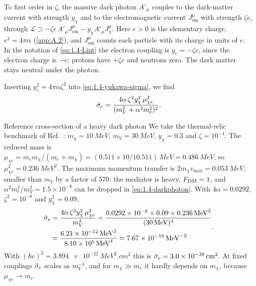 \begin{keyresult}
To first order in $\zeta$, the massive dark photon $A'_\mu$ couples to the dark-matter current with strength $y_\chi$ and to the electromagnetic current $J^\mu_{\mathrm{em}}$ with strength $\zeta e$, through $\mathcal{L} \supset -\zeta e\,A'_\mu J^\mu_{\mathrm{em}} - y_\chi A'_\mu J^\mu_\chi$. Here $e > 0$ is the elementary charge, $e^2 = 4\pi\alpha$ (\cref{app:A.2}), and $J^\mu_{\mathrm{em}}$ counts each particle with its charge in units of $e$. In the notation of \cref{eq:1.4-Lint} the electron coupling is $y_e = -\zeta e$, since the electron charge is $-e$; protons have $+\zeta e$ and neutrons zero. The dark matter stays neutral under the photon.
\end{keyresult}

\noindent Inserting $y_e^2 = 4\pi\alpha\zeta^2$ into \cref{eq:1.4-yukawa-sigma}, we find~\cites[Eq.~(74)]{lin2019tasi}[display above Eq.~(15)]{essig2012direct}
\begin{equation}
  \bar{\sigma}_{e} = \frac{4\alpha\,\zeta^2 y_\chi^2\,\mu_{\chi e}^2}{(m_V^2 + \alpha^2 m_e^2)^2}.
  \label{eq:1.4-darkphoton}
\end{equation}

\begin{workedexample}{Reference cross-section of a heavy dark photon}\label{we:1-darkphoton}
We take the thermal-relic benchmark of Ref.~\cite[Sect.~III\,D]{lin2019tasi}: $m_\chi = \SI{10}{MeV}$, $m_V = \SI{30}{MeV}$, $y_\chi = 0.3$ and $\zeta = 10^{-4}$. The reduced mass is $\mu_{\chi e} = m_e m_\chi/(m_e + m_\chi) = (0.511 \times 10/10.511)\,\si{MeV} = \SI{0.486}{MeV}$, so $\mu_{\chi e}^2 = \SI{0.236}{MeV^2}$. The maximum momentum transfer is $2m_\chi v_{\mathrm{max}} = \SI{0.053}{MeV}$, smaller than $m_V$ by a factor of 570: the mediator is heavy, $F_{\mathrm{DM}} = 1$, and $\alpha^2 m_e^2/m_V^2 = 1.5\times10^{-8}$ can be dropped in \cref{eq:1.4-darkphoton}. With $4\alpha = 0.0292$, $\zeta^2 = 10^{-8}$ and $y_\chi^2 = 0.09$,
\begin{equation*}
  \begin{aligned}
  \bar{\sigma}_{e} &= \frac{4\alpha\,\zeta^2 y_\chi^2\,\mu_{\chi e}^2}{m_V^4}
  = \frac{0.0292 \times 10^{-8} \times 0.09 \times \SI{0.236}{MeV^2}}{(\SI{30}{MeV})^4} \\
  &= \frac{\SI{6.21e-12}{MeV^2}}{\SI{8.10e5}{MeV^4}} = \SI{7.67e-18}{MeV^{-2}}
  \end{aligned}.
\end{equation*}
With $(\hbar c)^2 = \SI{3.894e-22}{MeV^2.cm^2}$ this is $\bar{\sigma}_{e} = \SI{3.0e-39}{cm^2}$. At fixed couplings $\bar{\sigma}_{e}$ scales as $m_V^{-4}$, and for $m_\chi \gg m_e$ it hardly depends on $m_\chi$, because $\mu_{\chi e} \to m_e$.
\end{workedexample}

